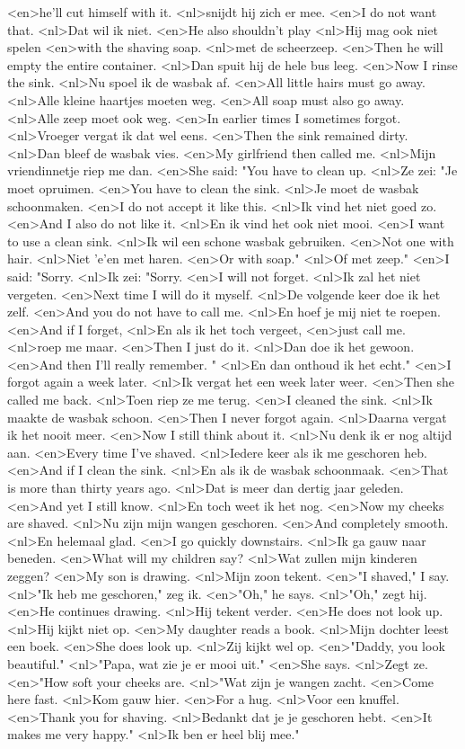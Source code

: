 <en>he'll cut himself with it.
<nl>snijdt hij zich er mee.
<en>I do not want that.
<nl>Dat wil ik niet.
<en>He also shouldn't play
<nl>Hij mag ook niet spelen
<en>with the shaving soap.
<nl>met de scheerzeep.
<en>Then he will empty the entire container.
<nl>Dan spuit hij de hele bus leeg.
<en>Now I rinse the sink.
<nl>Nu spoel ik de wasbak af.
<en>All little hairs must go away.
<nl>Alle kleine haartjes moeten weg.
<en>All soap must also go away.
<nl>Alle zeep moet ook weg.
<en>In earlier times I sometimes forgot.
<nl>Vroeger vergat ik dat wel eens.
<en>Then the sink remained dirty.
<nl>Dan bleef de wasbak vies.
<en>My girlfriend then called me.
<nl>Mijn vriendinnetje riep me dan.
<en>She said: "You have to clean up.
<nl>Ze zei: "Je moet opruimen.
<en>You have to clean the sink.
<nl>Je moet de wasbak schoonmaken.
<en>I do not accept it like this.
<nl>Ik vind het niet goed zo.
<en>And I also do not like it.
<nl>En ik vind het ook niet mooi.
<en>I want to use a clean sink.
<nl>Ik wil een schone wasbak gebruiken.
<en>Not one with hair.
<nl>Niet 'e'en met haren.
<en>Or with soap."
<nl>Of met zeep."
<en>I said: "Sorry.
<nl>Ik zei: "Sorry.
<en>I will not forget.
<nl>Ik zal het niet vergeten.
<en>Next time I will do it myself.
<nl>De volgende keer doe ik  het zelf.
<en>And you do not have to call me.
<nl>En hoef je mij niet te roepen.
<en>And if I forget,
<nl>En als ik het toch vergeet,
<en>just call me.
<nl>roep me maar.
<en>Then I just do it.
<nl>Dan doe ik het gewoon.
<en>And then I'll really remember. "
<nl>En dan onthoud ik het echt."
<en>I forgot again a week later.
<nl>Ik vergat het een week later weer.
<en>Then she called me back.
<nl>Toen riep ze me terug.
<en>I cleaned the sink.
<nl>Ik maakte de wasbak schoon.
<en>Then I never forgot again.
<nl>Daarna vergat ik het nooit meer.
<en>Now I still think about it.
<nl>Nu denk ik er nog altijd aan.
<en>Every time I've shaved.
<nl>Iedere keer als ik me geschoren heb.
<en>And if I clean the sink.
<nl>En als ik de wasbak schoonmaak.
<en>That is more than thirty years ago.
<nl>Dat is meer dan dertig jaar geleden.
<en>And yet I still know.
<nl>En toch weet ik het nog.
<en>Now my cheeks are shaved.
<nl>Nu zijn mijn wangen geschoren.
<en>And completely smooth.
<nl>En helemaal glad.
<en>I go quickly downstairs.
<nl>Ik ga gauw naar beneden.
<en>What will my children say?
<nl>Wat zullen mijn kinderen zeggen?
<en>My son is drawing.
<nl>Mijn zoon tekent.
<en>"I shaved," I say.
<nl>"Ik heb me geschoren," zeg ik.
<en>"Oh," he says.
<nl>"Oh," zegt hij.
<en>He continues drawing.
<nl>Hij tekent verder.
<en>He does not look up.
<nl>Hij kijkt niet op.
<en>My daughter reads a book.
<nl>Mijn dochter leest een boek.
<en>She does look up.
<nl>Zij kijkt wel op.
<en>"Daddy, you look beautiful."
<nl>"Papa, wat zie je er mooi uit."
<en>She says.
<nl>Zegt ze.
<en>"How soft your cheeks are.
<nl>"Wat zijn je wangen zacht.
<en>Come here fast.
<nl>Kom gauw hier.
<en>For a hug.
<nl>Voor een knuffel.
<en>Thank you for shaving.
<nl>Bedankt dat je je geschoren hebt.
<en>It makes me very  happy."
<nl>Ik ben er heel blij mee."
